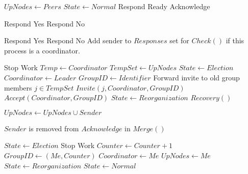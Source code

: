 \begin{algorithmic}
\State

        \State $UpNodes \gets Peers$
        \State $State \gets Normal$
        \State Respond Ready Acknowledge 
    \EndIf
\EndFunction

\State

        \State Respond Yes
    \Else
        \State Respond No
    \EndIf
\EndFunction

\State

        \State Respond Yes
    \Else
        \State Respond No
        \State Add sender to $Responses$ set for $Check()$ if this process is a coordinator.
    \EndIf
\EndFunction

\State

        \Return
    \EndIf
        \Return
    \EndIf
    \State Stop Work
    \State $Temp \gets Coordinator$
    \State $TempSet \gets UpNodes$
    \State $State \gets Election$
    \State $Coordinator \gets Leader$
    \State $GroupID \gets Identifier$
        \State Forward invite to old group members
        \For $j \in TempSet$
            \State $Invite(j,Coordinator,GroupID)$
        \EndFor
    \EndIf
    \State $Accept(Coordinator,GroupID)$
    \State $State \gets Reorganization$
        \State $Recovery()$
    \EndIf
\EndFunction

\State

        \State $UpNodes \gets UpNodes \cup {Sender}$
    \EndIf
\EndFunction

    \State $Sender$ is removed from $Acknowledge$ in $Merge()$
\EndFunction

\State

    \State $State \gets Election$
    \State Stop Work
    \State $Counter \gets Counter + 1$
    \State $GroupID \gets (Me,Counter)$
    \State $Coordinator \gets Me$
    \State $UpNodes \gets {Me}$
    \State $State \gets Reorganization$
    \State $State \gets Normal$
\EndFunction

\end{algorithmic}

